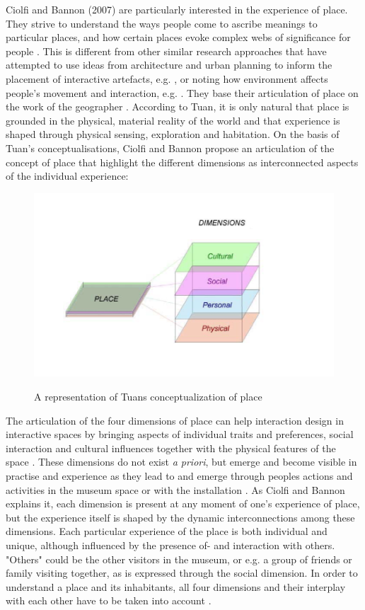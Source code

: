 Ciolfi and Bannon (2007) are particularly interested in the experience of place. They strive to understand the ways people come to ascribe meanings to particular places, and how certain places evoke complex webs of significance for people \autocite[p. 160]{hybridplace_ciolfi}. This is different from other similar research approaches that have attempted to use ideas from architecture and urban planning to inform the placement of interactive artefacts, e.g. \autocite{Cullen_book}, or noting how environment affects people's movement and interaction, e.g. \autocite{Alexander_book}. They base their articulation of place on the work of the geographer \autocite{Tuan_book}. According to Tuan, it is only natural that place is grounded in the physical, material reality of the world and that experience is shaped through physical sensing, exploration and habitation. On the basis of Tuan's conceptualisations, Ciolfi and Bannon propose an articulation of the concept of place that highlight the different dimensions as interconnected aspects of the individual experience:


\begin{figure}[H]
\includegraphics[width=12cm]{pictures/tuans_dimensions.png}
\caption{A representation of Tuans conceptualization of place}
\centering 
\autocite[p. 224]{spaceplace_ciolfi}
\end{figure}

The articulation of the four dimensions of place can help interaction design in interactive spaces by bringing aspects of individual traits and preferences, social interaction and cultural influences together with the physical features of the space \autocite[p. 163]{hybridplace_ciolfi}. These dimensions do not exist \emph{a priori}, but emerge and become visible in practise and experience as they lead to and emerge through peoples actions and activities in the museum space or with the installation \autocite[p. 163]{hybridplace_ciolfi}. As Ciolfi and Bannon explains it, each dimension is present at any moment of one's experience of place, but the experience itself is shaped by the dynamic interconnections among these dimensions. Each particular experience of the place is both individual and unique, although influenced by the presence of- and interaction with others. "Others" could be the other visitors in the museum, or e.g. a group of friends or family visiting together, as is expressed through the social dimension. In order to understand a place and its inhabitants, all four dimensions and their interplay with each other have to be taken into account \autocite[p. 162]{hybridplace_ciolfi}.

